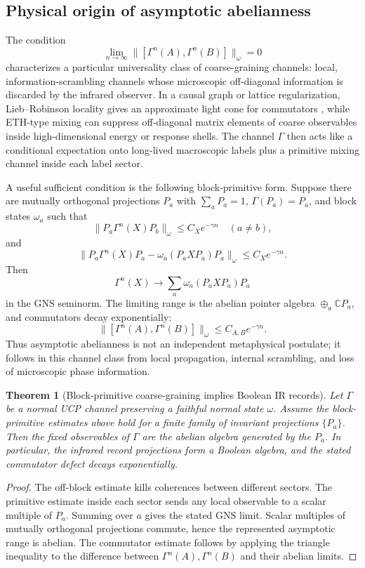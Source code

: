 \documentclass[11pt]{article}
\newtheorem{theorem}{Theorem}[section]
\begin{document}
\subsection{Physical origin of asymptotic abelianness}

The condition
\[
\lim_{n\to\infty}\|[\Gamma^n(A),\Gamma^n(B)]\|_\omega=0
\]
characterizes a particular universality class of coarse-graining channels:
local, information-scrambling channels whose microscopic off-diagonal
information is discarded by the infrared observer.  In a causal graph or
lattice regularization, Lieb--Robinson locality gives an approximate light
cone for commutators \cite{LiebRobinson1972}, while ETH-type mixing
\cite{Deutsch1991,Srednicki1994} can suppress off-diagonal matrix
elements of coarse observables inside high-dimensional energy or response
shells.  The channel $\Gamma$ then acts like a conditional expectation onto
long-lived macroscopic labels plus a primitive mixing channel inside each
label sector.

A useful sufficient condition is the following block-primitive form.  Suppose there are mutually orthogonal projections $P_a$ with $\sum_aP_a=1$, $\Gamma(P_a)=P_a$, and block states $\omega_a$ such that
\[
\|P_a\Gamma^n(X)P_b\|_\omega\le C_Xe^{-\gamma n}\quad (a\ne b),
\]
and
\[
\|P_a\Gamma^n(X)P_a-\omega_a(P_aXP_a)P_a\|_\omega\le C_Xe^{-\gamma n}.
\]
Then
\[
\Gamma^n(X)\longrightarrow \sum_a\omega_a(P_aXP_a)P_a
\]
in the GNS seminorm.  The limiting range is the abelian pointer algebra $\oplus_a\mathbb C P_a$, and commutators decay exponentially:
\[
\|[\Gamma^n(A),\Gamma^n(B)]\|_\omega\le C_{A,B}e^{-\gamma n}.
\]
Thus asymptotic abelianness is not an independent metaphysical postulate; it follows in this channel class from local propagation, internal scrambling, and loss of microscopic phase information.

\begin{theorem}[Block-primitive coarse-graining implies Boolean IR records]\label{thm:block-primitive-abelian}
Let $\Gamma$ be a normal UCP channel preserving a faithful normal state
$\omega$.  Assume the block-primitive estimates above hold for a finite
family of invariant projections $\{P_a\}$.  Then the fixed observables of
$\Gamma$ are the abelian algebra generated by the \(P_a\).  In particular,
the infrared record projections form a Boolean algebra, and the stated
commutator defect decays exponentially.
\end{theorem}

\begin{proof}
The off-block estimate kills coherences between different sectors.  The primitive estimate inside each sector sends any local observable to a scalar multiple of $P_a$.  Summing over $a$ gives the stated GNS limit.  Scalar multiples of mutually orthogonal projections commute, hence the represented asymptotic range is abelian.  The commutator estimate follows by applying the triangle inequality to the difference between $\Gamma^n(A),\Gamma^n(B)$ and their abelian limits.
\end{proof}
\end{document}
